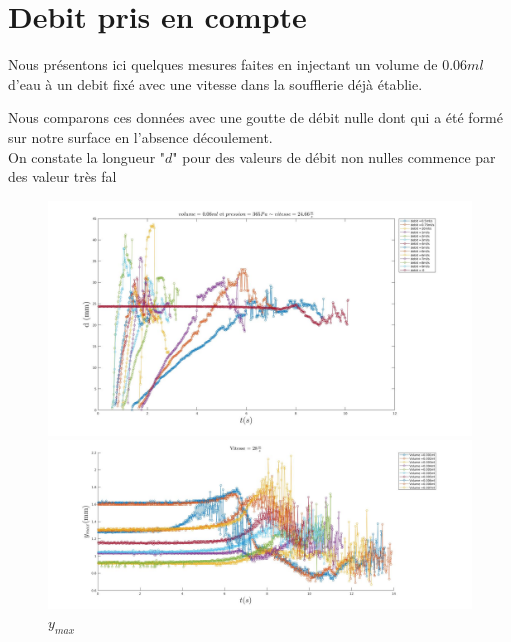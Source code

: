 \documentclass[french]{article}
\begin{document}
\section{Debit pris en compte}

Nous présentons ici quelques mesures faites en injectant un volume de $0.06ml$ d'eau  à un debit fixé avec une vitesse dans la soufflerie déjà établie.

Nous comparons ces données avec une goutte de débit nulle dont qui a été formé sur notre surface en l'absence découlement.\\


On constate la longueur "$d$" pour des valeurs de débit non nulles commence par des valeur très fal

\begin{figure}[!h]
	\centering
	\begin{minipage}{0.95\linewidth}
	\includegraphics[width = \linewidth]{./image/p=365_vol=006d.jpg}
	\caption{$d$}
	\end{minipage}
	\begin{minipage}{0.95\linewidth}
	\includegraphics[width = \linewidth]{./image/v=28ym.jpg}
	\caption{$y_{max}$}
	\end{minipage}
\end{figure}
\end{document}
